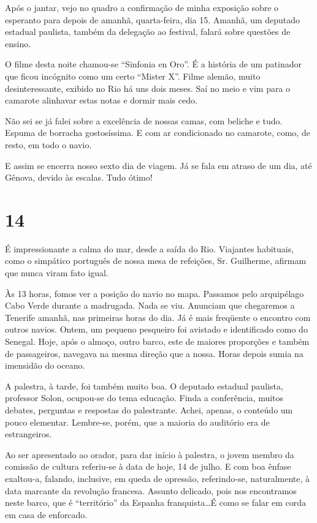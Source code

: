 Após o jantar, vejo no quadro a confirmação de minha exposição sobre o esperanto para depois de amanhã, quarta-feira, dia 15. Amanhã, um deputado estadual paulista, também da delegação ao festival, falará sobre questões de ensino.

O filme desta noite chamou-se ``Sinfonia en Oro''. É a história de um patinador que ficou incógnito como um certo ``Mister X''. Filme alemão, muito desinteressante, exibido no Rio há uns dois meses. Saí no meio e vim para o camarote alinhavar estas notas e dormir mais cedo.

Não sei se já falei sobre a excelência de nossas camas, com beliche e tudo. Espuma de borracha gostosíssima. E com ar condicionado no camarote, como, de resto, em todo o navio.

E assim se encerra nosso sexto dia de viagem. Já se fala em atraso de um dia, até Gênova, devido às escalas. Tudo ótimo!


\section*{14 \adfflatleafright {}}

É impressionante a calma do mar, desde a saída do Rio. Viajantes habituais, como o simpático português de nossa mesa de refeições, Sr. Guilherme, afirmam que nunca viram fato igual.

Às 13 horas, fomos ver a posição do navio no mapa. Passamos pelo arquipélago Cabo Verde durante a madrugada. Nada se viu. Anunciam que chegaremos a Tenerife amanhã, nas primeiras horas do dia. Já é mais freqüente o encontro com outros navios. Ontem, um pequeno pesqueiro foi avistado e identificado como do Senegal. Hoje, após o almoço, outro barco, este de maiores proporções e também de passageiros, navegava na mesma direção que a nossa. Horas depois sumia na imensidão do oceano.

A palestra, à tarde, foi também muito boa. O deputado estadual paulista, professor Solon, ocupou-se do tema educação. Finda a conferência, muitos debates, perguntas e respostas do palestrante. Achei, apenas, o conteúdo um pouco elementar. Lembre-se, porém, que a maioria do auditório era de estrangeiros.

Ao ser apresentado ao orador, para dar início à palestra, o jovem membro da comissão de cultura referiu-se à data de hoje, 14 de julho. E com boa ênfase exaltou-a, falando, inclusive, em queda de opressão, referindo-se, naturalmente, à data marcante da revolução francesa. Assunto delicado, pois nos encontramos neste barco, que é ``território'' da Espanha franquista\ldots É como se falar em corda em casa de enforcado.

